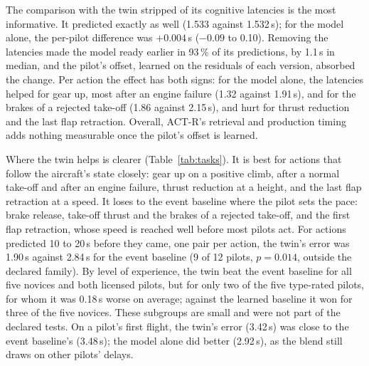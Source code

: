 \documentclass{llncs}
\begin{document}
The comparison with the twin stripped of its cognitive latencies is the most informative. It predicted exactly as well (1.533 against
1.532\,s); for the model alone, the per-pilot difference was $+0.004$\,s ($-0.09$ to 0.10). Removing the latencies made the model ready
earlier in 93\,\% of its predictions, by 1.1\,s in median, and the pilot's offset, learned on the residuals of each version, absorbed the
change. Per action the effect has both signs: for the model alone, the latencies helped for gear up, most after an engine failure (1.32
against 1.91\,s), and for the brakes of a rejected take-off (1.86 against 2.15\,s), and hurt for thrust reduction and the last flap
retraction. Overall, ACT-R's retrieval and production timing adds nothing measurable once the pilot's offset is learned.

Where the twin helps is clearer (Table~\ref{tab:tasks}). It is best for actions that follow the aircraft's state closely: gear up on a
positive climb, after a normal take-off and after an engine failure, thrust reduction at a height, and the last flap retraction at a
speed. It loses to the event baseline where the pilot sets the pace: brake release, take-off thrust and the brakes of a rejected take-off,
and the first flap retraction, whose speed is reached well before most pilots act. For actions predicted 10 to 20\,s before they came,
one pair per action, the twin's error was 1.90\,s against 2.84\,s for the event baseline (9 of 12 pilots, $p = 0.014$, outside the
declared family). By level of experience, the twin beat the event baseline for all five novices and both licensed pilots, but for only
two of the five type-rated pilots, for whom it was 0.18\,s worse on average; against the learned baseline it won for three of the five
novices. These subgroups are small and were not part of the declared tests. On a pilot's first flight, the twin's error (3.42\,s) was
close to the event baseline's (3.48\,s); the model alone did better (2.92\,s), as the blend still draws on other pilots' delays.
\end{document}
